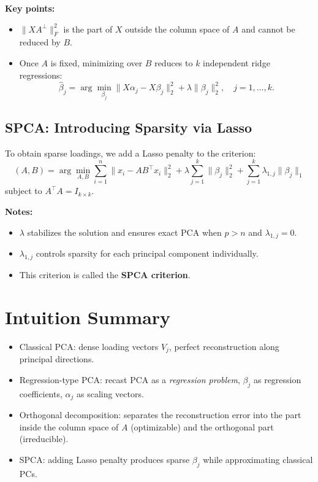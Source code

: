 \documentclass[12pt]{article}
\begin{document}
\textbf{Key points:}
\begin{itemize}
    \item $\|X A^\perp\|_F^2$ is the part of $X$ outside the column space of $A$ and cannot be reduced by $B$.
    \item Once $A$ is fixed, minimizing over $B$ reduces to $k$ independent ridge regressions:
    \[
    \hat{\beta}_j = \arg \min_{\beta_j} \| X \alpha_j - X \beta_j \|_2^2 + \lambda \|\beta_j\|_2^2, \quad j=1,\dots,k.
    \]
\end{itemize}

\subsection{SPCA: Introducing Sparsity via Lasso}

To obtain sparse loadings, we add a Lasso penalty to the criterion:
\[
(A, B) = \arg \min_{A,B} \sum_{i=1}^n \| x_i - A B^\top x_i \|_2^2 + \lambda \sum_{j=1}^k \|\beta_j\|_2^2 + \sum_{j=1}^k \lambda_{1,j} \|\beta_j\|_1
\]
subject to $A^\top A = I_{k \times k}$.  

\textbf{Notes:}
\begin{itemize}
    \item $\lambda$ stabilizes the solution and ensures exact PCA when $p>n$ and $\lambda_{1,j}=0$.
    \item $\lambda_{1,j}$ controls sparsity for each principal component individually.
    \item This criterion is called the \textbf{SPCA criterion}.
\end{itemize}

\section{Intuition Summary}

\begin{itemize}
    \item Classical PCA: dense loading vectors $V_j$, perfect reconstruction along principal directions.
    \item Regression-type PCA: recast PCA as a \emph{regression problem}, $\beta_j$ as regression coefficients, $\alpha_j$ as scaling vectors.
    \item Orthogonal decomposition: separates the reconstruction error into the part inside the column space of $A$ (optimizable) and the orthogonal part (irreducible).
    \item SPCA: adding Lasso penalty produces sparse $\beta_j$ while approximating classical PCs.
\end{itemize}
\end{document}
